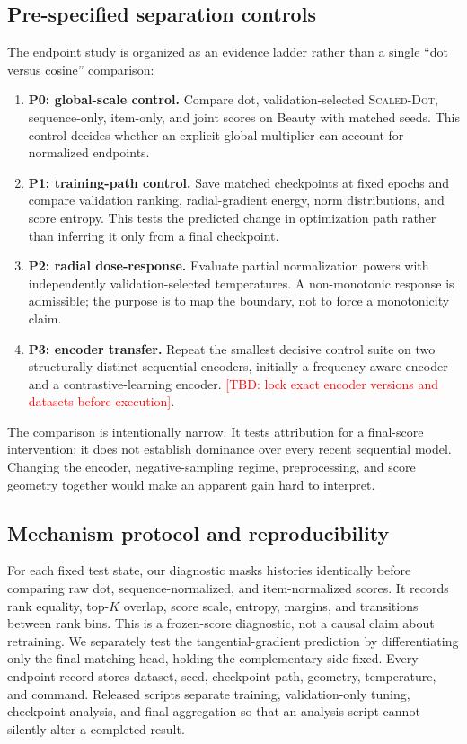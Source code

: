 \documentclass[sigconf,anonymous,review]{acmart}
\newcommand{\scaledot}{\textsc{Scaled-Dot}}
\newcommand{\TODO}[1]{\textcolor{red}{[TBD: #1]}}
\begin{document}
\subsection{Pre-specified separation controls}
The endpoint study is organized as an evidence ladder rather than a single ``dot versus cosine'' comparison:
\begin{enumerate}[leftmargin=*,noitemsep,topsep=2pt]
\item \textbf{P0: global-scale control.} Compare dot, validation-selected \scaledot{}, sequence-only, item-only, and joint scores on Beauty with matched seeds. This control decides whether an explicit global multiplier can account for normalized endpoints.
\item \textbf{P1: training-path control.} Save matched checkpoints at fixed epochs and compare validation ranking, radial-gradient energy, norm distributions, and score entropy. This tests the predicted change in optimization path rather than inferring it only from a final checkpoint.
\item \textbf{P2: radial dose-response.} Evaluate partial normalization powers with independently validation-selected temperatures. A non-monotonic response is admissible; the purpose is to map the boundary, not to force a monotonicity claim.
\item \textbf{P3: encoder transfer.} Repeat the smallest decisive control suite on two structurally distinct sequential encoders, initially a frequency-aware encoder and a contrastive-learning encoder. \TODO{lock exact encoder versions and datasets before execution}.
\end{enumerate}

The comparison is intentionally narrow. It tests attribution for a final-score intervention; it does not establish dominance over every recent sequential model. Changing the encoder, negative-sampling regime, preprocessing, and score geometry together would make an apparent gain hard to interpret.

\subsection{Mechanism protocol and reproducibility}
For each fixed test state, our diagnostic masks histories identically before comparing raw dot, sequence-normalized, and item-normalized scores. It records rank equality, top-$K$ overlap, score scale, entropy, margins, and transitions between rank bins. This is a frozen-score diagnostic, not a causal claim about retraining. We separately test the tangential-gradient prediction by differentiating only the final matching head, holding the complementary side fixed. Every endpoint record stores dataset, seed, checkpoint path, geometry, temperature, and command. Released scripts separate training, validation-only tuning, checkpoint analysis, and final aggregation so that an analysis script cannot silently alter a completed result.
\end{document}
